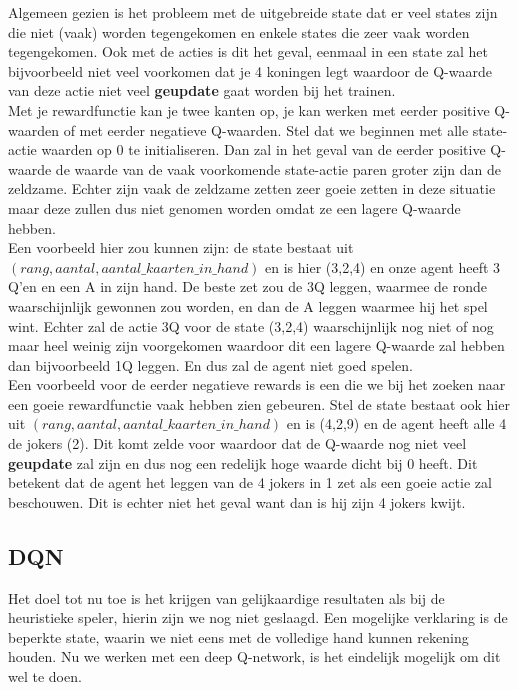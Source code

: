 \documentclass[11pt]{article}
\begin{document}
Algemeen gezien is het probleem met de uitgebreide state dat er veel states zijn die niet (vaak) worden tegengekomen en enkele states die zeer vaak worden tegengekomen. Ook met de acties is dit het geval, eenmaal in een state zal het bijvoorbeeld niet veel voorkomen dat je 4 koningen legt waardoor de Q-waarde van deze actie niet veel \textbf{geupdate} gaat worden bij het trainen. \\
Met je rewardfunctie kan je twee kanten op, je kan werken met eerder positive Q-waarden of met eerder negatieve Q-waarden. Stel dat we beginnen met alle state-actie waarden op 0 te initialiseren. Dan zal in het geval van de eerder positive Q-waarde de waarde van de vaak voorkomende state-actie paren groter zijn dan de zeldzame. Echter zijn vaak de zeldzame zetten zeer goeie zetten in deze situatie maar deze zullen dus niet genomen worden omdat ze een lagere Q-waarde hebben.\\
Een voorbeeld hier zou kunnen zijn: de state bestaat uit $(rang, aantal, aantal\_kaarten\_in\_hand)$ en is hier (3,2,4) en onze agent heeft 3 Q'en en een A in zijn hand. De beste zet zou de 3Q leggen, waarmee de ronde waarschijnlijk gewonnen zou worden, en dan de A leggen waarmee hij het spel wint. Echter zal de actie 3Q voor de state (3,2,4) waarschijnlijk nog niet of nog maar heel weinig zijn voorgekomen waardoor dit een lagere Q-waarde zal hebben dan bijvoorbeeld 1Q leggen. En dus zal de agent niet goed spelen.\\
Een voorbeeld voor de eerder negatieve rewards is een die we bij het zoeken naar een goeie rewardfunctie vaak hebben zien gebeuren. Stel de state bestaat ook hier uit $(rang, aantal, aantal\_kaarten\_in\_hand)$ en is (4,2,9) en de agent heeft alle 4 de jokers (2). Dit komt zelde voor waardoor dat de Q-waarde nog niet veel \textbf{geupdate} zal zijn en dus nog een redelijk hoge waarde dicht bij 0 heeft. Dit betekent dat de agent het leggen van de 4 jokers in 1 zet als een goeie actie zal beschouwen. Dit is echter niet het geval want dan is hij zijn 4 jokers kwijt.

\subsection{DQN}
Het doel tot nu toe is het krijgen van gelijkaardige resultaten als bij de heuristieke speler, hierin zijn we nog niet geslaagd. Een mogelijke verklaring is de beperkte state, waarin we niet eens met de volledige hand kunnen rekening houden. Nu we werken met een deep Q-network, is het eindelijk mogelijk om dit wel te doen.\\\\
\end{document}
